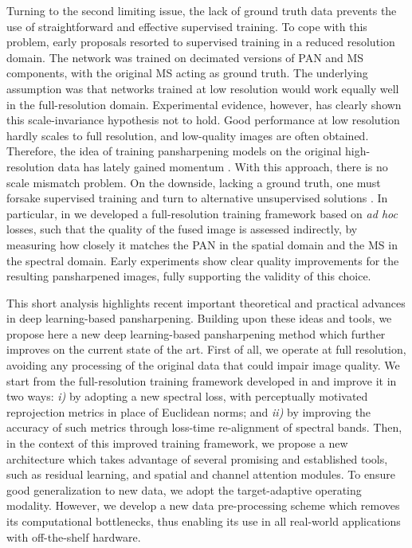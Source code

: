 \documentclass[journal]{IEEEtran}
\begin{document}
Turning to the second limiting issue,
the lack of ground truth data prevents the use of straightforward and effective supervised training.
To cope with this problem,
early proposals \cite{Masi2016, Yang2017} resorted to supervised training in a reduced resolution domain.
The network was trained on decimated versions of PAN and MS components, with the original MS acting as ground truth.
The underlying assumption was that networks trained at low resolution
would work equally well in the full-resolution domain.
Experimental evidence, however, has clearly shown this scale-invariance hypothesis not to hold.
Good performance at low resolution hardly scales to full resolution, and low-quality images are often obtained.
Therefore, the idea of training pansharpening models on the original high-resolution data has lately gained momentum \cite{Luo2020, Ciotola2022}.
With this approach, there is no scale mismatch problem.
On the downside, lacking a ground truth, one must forsake supervised training and turn to alternative unsupervised solutions
\cite{Luo2020, Ciotola2022, Uezato2020, Ma2020, Seo2020}.
In particular, in \cite{Ciotola2022} we developed a full-resolution training framework based on {\it ad hoc} losses,
such that the quality of the fused image is assessed indirectly,
by measuring how closely it matches the PAN in the spatial domain and the MS in the spectral domain.
Early experiments show clear quality improvements for the resulting pansharpened images, fully supporting the validity of this choice.

This short analysis highlights recent important theoretical and practical advances in deep learning-based pansharpening.
Building upon these ideas and tools,
we propose here a new deep learning-based pansharpening method which further improves on the current state of the art.
First of all, we operate at full resolution, avoiding any processing of the original data that could impair image quality.
We start from the full-resolution training framework developed in \cite{Ciotola2022} and improve it in two ways:
{\it  i)} by adopting a new spectral loss, with perceptually motivated reprojection metrics in place of Euclidean norms; and
{\it ii)} by improving the accuracy of such metrics through loss-time re-alignment of spectral bands.
Then, in the context of this improved training framework,
we propose a new architecture which takes advantage of several promising and established tools,
such as residual learning, and spatial and channel attention modules.
To ensure good generalization to new data, we adopt the target-adaptive operating modality.
However, we develop a new data pre-processing scheme which removes its computational bottlenecks,
thus enabling its use in all real-world applications with off-the-shelf hardware.
\end{document}
